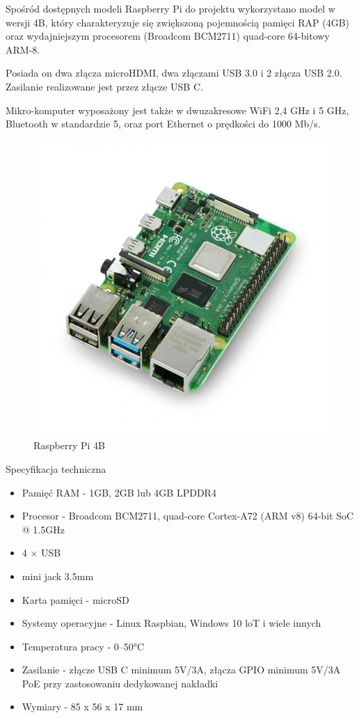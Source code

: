 \documentclass[a4paper,12pt,reqno]{article}
\begin{document}
Spośród dostępnych modeli Raspberry Pi do projektu wykorzystano model w wersji 4B, który charakteryzuje się zwiększoną pojemnością pamięci RAP (4GB) oraz wydajniejszym procesorem (Broadcom BCM2711) quad-core 64-bitowy ARM-8.

Posiada on dwa złącza microHDMI, dwa złączami USB 3.0 i 2 złącza USB 2.0. Zasilanie realizowane jest przez złącze USB C.

Mikro-komputer wyposażony jest także w dwuzakresowe WiFi 2,4 GHz i 5 GHz, Bluetooth w standardzie 5, oraz port Ethernet o prędkości do 1000 Mb/s.

\begin{figure}[H]%
\centering
\includegraphics[width=0.8\columnwidth]{imgs/raspberrypi4.jpg}
\caption{Raspberry Pi 4B \cite{img_rp4b} \label{rp4b}}
\quad
\end{figure}

Specyfikacja techniczna

\begin{itemize}
	\item Pamięć RAM - 1GB, 2GB lub 4GB LPDDR4
	\item Procesor - Broadcom BCM2711, quad-core Cortex-A72 (ARM v8) 64-bit SoC @ 1.5GHz
	\item 4 × USB
	\item mini jack 3.5mm
	\item Karta pamięci - microSD
	\item Systemy operacyjne - Linux Raspbian, Windows 10 loT i wiele innych
	\item Temperatura pracy - 0–50°C
	\item Zasilanie - złącze USB C minimum 5V/3A, złącza GPIO minimum 5V/3A PoE przy zastosowaniu dedykowanej nakładki
	\item Wymiary - 85 x 56 x 17 mm
\end{itemize}
\end{document}

